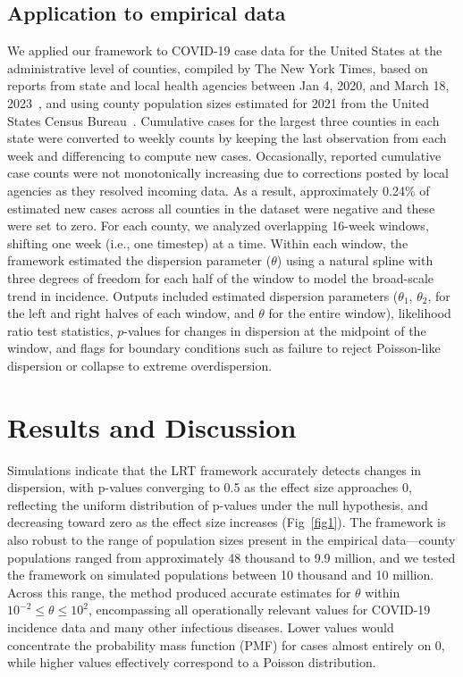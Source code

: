 \documentclass[11pt,letterpaper]{article}
\begin{document}
\subsection*{Application to empirical data}
We applied our framework to COVID-19 case data for the United States at the administrative level of counties, compiled by The New York Times, based on reports from state and local health agencies between Jan 4, 2020, and March 18, 2023~\citep{nytimes_covid19_2021}, and using county population sizes estimated for 2021 from the United States Census Bureau~\citep{us_census_county_estimates_2021}.
Cumulative cases for the largest three counties in each state were converted to weekly counts by keeping the last observation from each week and differencing to compute new cases. Occasionally, reported cumulative case counts were not monotonically increasing due to corrections posted by local agencies as they resolved incoming data. 
As a result, approximately 0.24\% of estimated new cases across all counties in the dataset were negative and these were set to zero. 
For each county, we analyzed overlapping 16-week windows, shifting one week (i.e., one timestep) at a time. 
Within each window, the framework estimated the dispersion parameter ($\theta$) using a natural spline with three degrees of freedom for each half of the window to model the broad-scale trend in incidence. 
Outputs included estimated dispersion parameters ($\theta_1$, $\theta_2$, for the left and right halves of each window, and $\theta$ for the entire window), likelihood ratio test statistics, $p$-values for changes in dispersion at the midpoint of the window, and flags for boundary conditions such as failure to reject Poisson-like dispersion or collapse to extreme overdispersion.

\section*{Results and Discussion}

Simulations indicate that the LRT framework accurately detects changes in dispersion, with p-values converging to 0.5 as the effect size approaches 0, reflecting the uniform distribution of p-values under the null hypothesis, and decreasing toward zero as the effect size increases (Fig~\ref{fig1}). The framework is also robust to the range of population sizes present in the empirical data—county populations ranged from approximately 48 thousand to 9.9 million, and we tested the framework on simulated populations between 10 thousand and 10 million. Across this range, the method produced accurate estimates for $\theta$ within $10^{-2} \leq \theta \leq 10^2$, encompassing all operationally relevant values for COVID-19 incidence data and many other infectious diseases. Lower values would concentrate the probability mass function (PMF) for cases almost entirely on 0, while higher values effectively correspond to a Poisson distribution.
\end{document}

